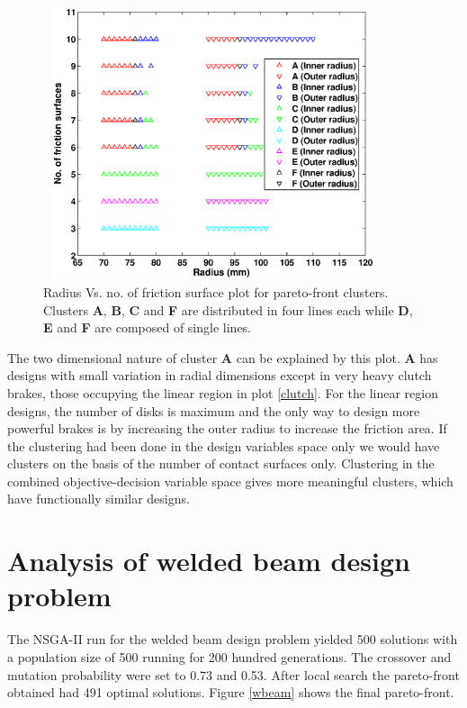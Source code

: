 \begin{figure}[ht]\begin{center}
 \includegraphics[width=100mm, height=80mm]{dia/clutchrVsZ.eps}
 \caption{Radius Vs. no. of friction surface plot for pareto-front
   clusters. Clusters \textbf{A}, \textbf{B}, \textbf{C} and \textbf{F} are
   distributed in four lines each while \textbf{D}, \textbf{E} and
   \textbf{F} are composed of single lines.}
 \label{clutchrVsZ}
\end{center}\end{figure}

The two dimensional nature of cluster \textbf{A} can be explained by this
plot. \textbf{A} has designs with small variation in radial dimensions
except in very heavy clutch brakes, those occupying the linear region in
plot \ref{clutch}. For the linear region designs, the number of disks is
maximum and the only way to design more powerful brakes is by increasing
the outer radius to increase the friction area. If the clustering had been
done in the design variables space only we would have clusters on the basis
of the number of contact surfaces only. Clustering in the combined
objective-decision variable space gives more meaningful clusters, which
have functionally similar designs.





\section{Analysis of welded beam design problem}
The NSGA-II run for the welded beam design problem yielded 500 solutions
with a population size of 500 running for 200 hundred generations. The
crossover and mutation probability were set to 0.73 and 0.53. After local
search the pareto-front obtained had 491 optimal solutions.  Figure
\ref{wbeam} shows the final pareto-front.


